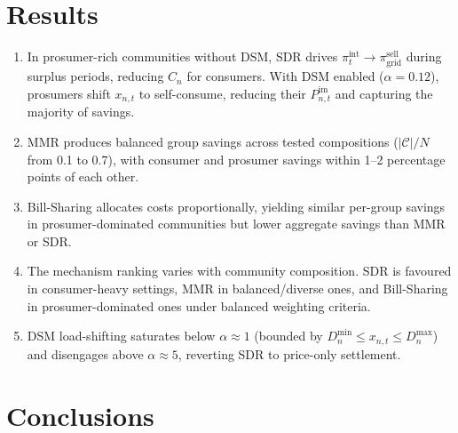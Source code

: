 \documentclass[11pt]{article}
\begin{document}
\section*{Results}

\begin{enumerate}

\item In prosumer-rich communities without DSM, SDR drives $\pi_t^{\text{int}} \to \pi_{\text{grid}}^{\text{sell}}$ during surplus periods, reducing $C_n$ for consumers. With DSM enabled ($\alpha = 0.12$), prosumers shift $x_{n,t}$ to self-consume, reducing their $P_{n,t}^{\text{im}}$ and capturing the majority of savings.

\item MMR produces balanced group savings across tested compositions ($|\mathcal{C}|/N$ from 0.1 to 0.7), with consumer and prosumer savings within 1--2 percentage points of each other.

\item Bill-Sharing allocates costs proportionally, yielding similar per-group savings in prosumer-dominated communities but lower aggregate savings than MMR or SDR.

\item The mechanism ranking varies with community composition. SDR is favoured in consumer-heavy settings, MMR in balanced/diverse ones, and Bill-Sharing in prosumer-dominated ones under balanced weighting criteria.

\item DSM load-shifting saturates below $\alpha \approx 1$ (bounded by $D_n^{\text{min}} \leq x_{n,t} \leq D_n^{\text{max}}$) and disengages above $\alpha \approx 5$, reverting SDR to price-only settlement.

\end{enumerate}

\vspace{1cm}

\section*{Conclusions}
\end{document}
